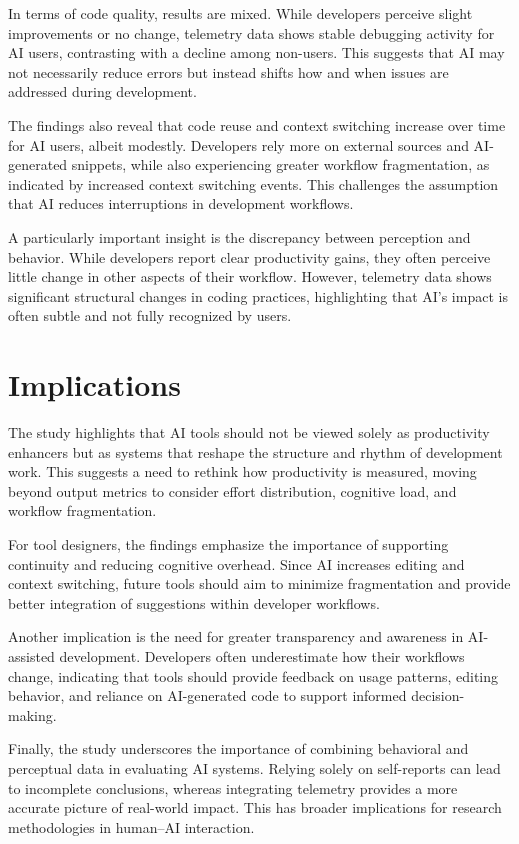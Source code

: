 In terms of code quality, results are mixed. While developers perceive slight improvements or no change, telemetry data shows stable debugging activity for AI users, contrasting with a decline among non-users. This suggests that AI may not necessarily reduce errors but instead shifts how and when issues are addressed during development.

The findings also reveal that code reuse and context switching increase over time for AI users, albeit modestly. Developers rely more on external sources and AI-generated snippets, while also experiencing greater workflow fragmentation, as indicated by increased context switching events. This challenges the assumption that AI reduces interruptions in development workflows.

A particularly important insight is the discrepancy between perception and behavior. While developers report clear productivity gains, they often perceive little change in other aspects of their workflow. However, telemetry data shows significant structural changes in coding practices, highlighting that AI's impact is often subtle and not fully recognized by users.

\section{Implications}
The study highlights that AI tools should not be viewed solely as productivity enhancers but as systems that reshape the structure and rhythm of development work. This suggests a need to rethink how productivity is measured, moving beyond output metrics to consider effort distribution, cognitive load, and workflow fragmentation.

For tool designers, the findings emphasize the importance of supporting continuity and reducing cognitive overhead. Since AI increases editing and context switching, future tools should aim to minimize fragmentation and provide better integration of suggestions within developer workflows.

Another implication is the need for greater transparency and awareness in AI-assisted development. Developers often underestimate how their workflows change, indicating that tools should provide feedback on usage patterns, editing behavior, and reliance on AI-generated code to support informed decision-making.

Finally, the study underscores the importance of combining behavioral and perceptual data in evaluating AI systems. Relying solely on self-reports can lead to incomplete conclusions, whereas integrating telemetry provides a more accurate picture of real-world impact. This has broader implications for research methodologies in human–AI interaction.

